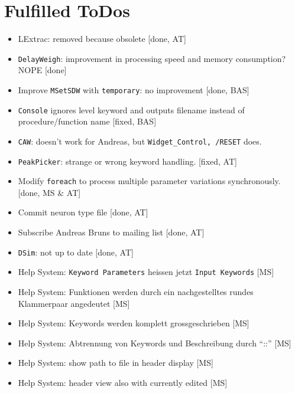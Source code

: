 \documentclass[12pt]{article}
\begin{document}
\section{Fulfilled ToDos}
\begin{itemize}
\item LExtrac: removed because obsolete [done, AT]
\item \texttt{DelayWeigh}: improvement in processing speed and memory consumption? NOPE [done]
\item Improve \texttt{MSetSDW} with \texttt{temporary}: no improvement [done, BAS]
\item \texttt{Console} ignores level keyword and outputs filename instead of procedure/function name [fixed, BAS]
\item \texttt{CAW}: doesn't work for Andreas, but \texttt{Widget_Control, /RESET} does.
\item \texttt{PeakPicker}: strange or wrong keyword handling. [fixed, AT]
\item Modify \texttt{foreach} to process multiple parameter variations synchronously. [done, MS & AT] 
\item Commit neuron type file [done, AT]
\item Subscribe Andreas Bruns to mailing list [done, AT] 
\item \texttt{DSim}: not up to date [done, AT]
\item Help System: \texttt{Keyword Parameters} heissen jetzt \texttt{Input Keywords} [MS]
\item Help System: Funktionen werden durch ein nachgestelltes rundes Klammerpaar angedeutet [MS]
\item Help System: Keywords werden komplett grossgeschrieben [MS]
\item Help System: Abtrennung von Keywords und Beschreibung durch ``::'' [MS]
\item Help System: show path to file in header display [MS]
\item Help System: header view also with currently edited [MS]
\end{itemize}
\end{document}
